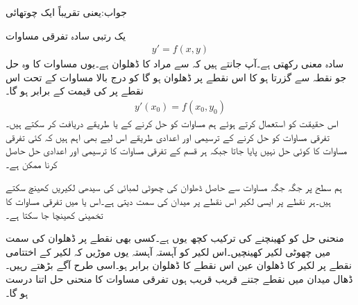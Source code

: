 جواب:یعنی تقریباً ایک چوتھائی

یک رتبی سادہ تفرقی مساوات
\begin{align}\label{مساوات_سادہ_اول_ڈھلوان_تفاعل_الف}
y'=f(x,y)
\end{align}
سادہ معنی رکھتی ہے۔آپ جانتے ہیں کہ  سے مراد  کا ڈھلوان ہے۔یوں مساوات  کا وہ حل جو نقطہ  سے گزرتا ہو کا اس نقطے پر ڈھلوان  ہو گا کو درج بالا مساوات کے تحت اس نقطے پر  کی قیمت کے برابر ہو گا۔
\begin{align*}
y'(x_0)=f(x_0,y_0)
\end{align*}
اس حقیقت کو استعمال کرتے ہوئے ہم مساوات  کو حل کرنے کے   یا  طریقے دریافت کر سکتے ہیں۔تفرقی مساوات کو حل کرنے کے ترسیمی اور اعدادی طریقے اس لیے بھی اہم ہیں کہ کئی تفرقی مساوات کا کوئی  حل نہیں پایا جاتا جبکہ ہر قسم کے تفرقی مساوات کا ترسیمی اور اعدادی حل حاصل کرنا ممکن ہے۔   

ہم  سطح پر جگہ جگہ مساوات  سے حاصل ڈھلوان کی چھوٹی لمبائی کی سیدھی لکیریں کھینچ سکتے ہیں۔ہر نقطے پر ایسی لکیر اس نقطے پر میدان کی سمت دیتی ہے۔اس  یا   میں تفرقی مساوات کا  تخمینی  کھینچا جا سکتا ہے۔

منحنی حل کو کھینچنے کی ترکیب کچھ یوں ہے۔کسی بھی نقطے پر ڈھلوان کی سمت میں چھوٹی لکیر کھینچیں۔اس لکیر کو آہستہ آہستہ یوں موڑیں کہ لکیر کے اختتامی نقطے پر لکیر کا ڈھلوان عین اس نقطے کا  ڈھلوان برابر ہو۔اسی طرح آگے بڑھتے رہیں۔ڈھال میدان میں نقطے جتنے قریب قریب ہوں تفرقی مساوات کا منحنی حل اتنا درست ہو گا۔

